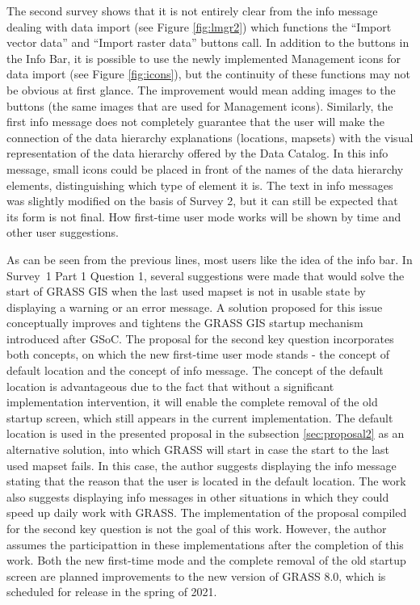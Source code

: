 \documentclass[a4paper,10pt,twoside]{article}
\begin{document}
The second survey shows that it is not entirely clear from the info
message dealing with data import (see Figure \ref{fig:lmgr2}) which
functions the ``Import vector data'' and ``Import raster data''
buttons call. In addition to the buttons in the Info Bar, it is
possible to use the newly implemented Management icons for data import
(see Figure \ref{fig:icons}), but the continuity of these functions
may not be obvious at first glance. The improvement would mean adding
images to the buttons (the same images that are used for Management
icons). Similarly, the first info message does not completely
guarantee that the user will make the connection of the data hierarchy
explanations (locations, mapsets) with the visual representation of
the data hierarchy offered by the Data Catalog. In this info message,
small icons could be placed in front of the names of the data
hierarchy elements, distinguishing which type of element it is. The
text in info messages was slightly modified on the basis of Survey 2,
but it can still be expected that its form is not final. How
first-time user mode works will be shown by time and other user
suggestions.

As can be seen from the previous lines, most users like the idea of
the info bar. In Survey~1 Part 1 Question 1, several suggestions were
made that would solve the start of GRASS GIS when the last used mapset
is not in usable state by displaying a warning or an error message. A
solution proposed for this issue conceptually improves and tightens
the GRASS GIS startup mechanism introduced after GSoC. The proposal
for the second key question incorporates both concepts, on which the
new first-time user mode stands - the concept of default location and
the concept of info message. The concept of the default location is
advantageous due to the fact that without a significant implementation
intervention, it will enable the complete removal of the old startup
screen, which still appears in the current implementation. The default
location is used in the presented proposal in the subsection
\ref{sec:proposal2} as an alternative solution, into which GRASS will
start in case the start to the last used mapset fails. In this case,
the author suggests displaying the info message stating that the
reason that the user is located in the default location. The work also
suggests displaying info messages in other situations in which they
could speed up daily work with GRASS.  The implementation of the 
proposal compiled for the second key question is not the goal of this work. 
However, the author assumes the participattion in these implementations 
after the completion of this work. Both the new first-time mode and the 
complete removal of the old startup screen are planned improvements to 
the new version of GRASS 8.0, which is scheduled for release in the spring of
2021.
\end{document}
